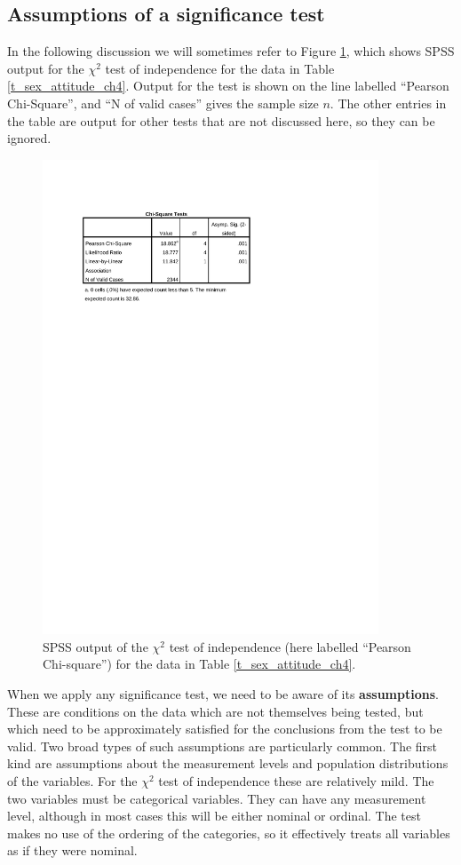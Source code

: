 \subsection{Assumptions of a significance test}
\label{ss_tables_chi2test_ass}

In the following discussion we will sometimes refer to Figure
\ref{f_spsschi2}, which shows SPSS output for the $\chi^{2}$ test of
independence for the data in Table \ref{t_sex_attitude_ch4}. Output for
the test is shown on the line labelled ``Pearson Chi-Square'', and ``N
of valid cases'' gives the sample size $n$. The other entries in the
table are output for other tests that are not discussed here, so they
can be ignored.

\begin{figure}
\caption{SPSS output of the $\chi^{2}$ test of independence (here labelled
``Pearson Chi-square'') for the data in Table \ref{t_sex_attitude_ch4}.}
\label{f_spsschi2}
\begin{center}
\includegraphics[width=100mm]{chi2test_ess}
\vspace*{-2ex}
\end{center}
\end{figure}


When we apply any significance test, we need to be aware of its
\textbf{assumptions}. These are conditions on the data which are not
themselves being tested, but which need to be approximately satisfied
for the conclusions from the test to be valid. Two broad types of such
assumptions are particularly common. The first kind are assumptions
about the measurement levels and population distributions of the
variables. For the $\chi^{2}$ test of independence these are relatively
mild. The two variables must be categorical variables. They can have any
measurement level, although in most cases this will be either nominal or
ordinal. The test makes no use of the ordering of the categories, so it
effectively treats all variables as if they were nominal.

